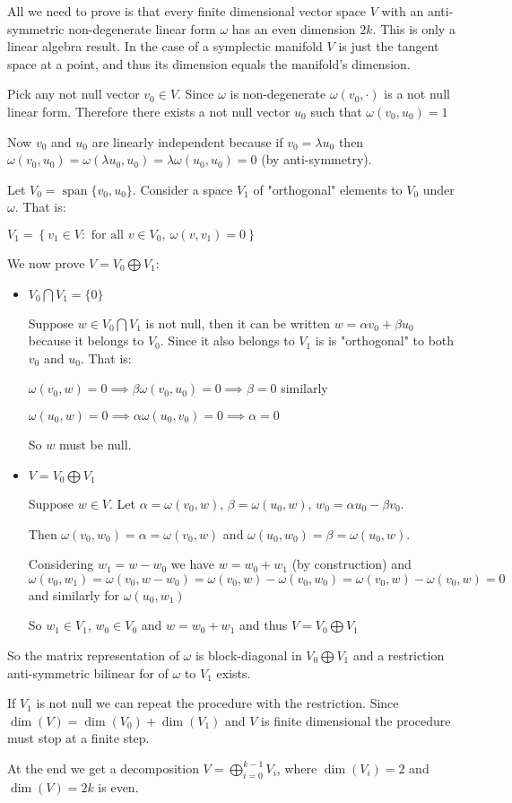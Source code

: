 \documentclass[12pt]{article}
\DeclareMathOperator{\dimens}{dim}
\DeclareMathOperator{\linspan}{span}
\begin{document}
All we need to prove is that every finite dimensional vector space $V$ with an anti-symmetric non-degenerate linear form $\omega$ has an even dimension $2k$. This is only a linear algebra result. In the case of a symplectic manifold $V$ is just the tangent space at a point, and thus its dimension equals the manifold's dimension.

Pick any not null vector $v_0 \in V$. Since $\omega$ is non-degenerate $\omega(v_0,\cdot)$ is a not null linear form. Therefore there exists a not null vector $u_0$ such that $\omega(v_0,u_0)=1$

Now $v_0$ and $u_0$ are linearly independent because if $v_0=\lambda u_0$ then $\omega(v_0, u_0) = \omega(\lambda u_0, u_0) = \lambda \omega(u_0,u_0) = 0$ (by anti-symmetry).

Let $V_0 = \linspan\{v_0, u_0\}$. Consider a space $V_1$ of "orthogonal" elements to $V_0$ under $\omega$. That is:

$V_1 = \left\{ v_1\in V: \text{ for all $v \in V_0$},\: \omega(v,v_1)=0 \right\}$

We now prove $V = V_0 \bigoplus V_1$:

\begin{itemize}

\item $V_0 \bigcap V_1 = \{0\}$

Suppose $w \in V_0 \bigcap V_1$ is not null, then it can be written $w = \alpha v_0 + \beta u_0$ because it belongs to $V_0$. Since it also belongs to $V_1$ is is "orthogonal" to both $v_0$ and $u_0$. That is:

$\omega(v_0,w) = 0 \implies \beta \omega(v_0,u_0) = 0 \implies \beta =0$
similarly

$\omega(u_0,w) = 0 \implies \alpha \omega(u_0,v_0) = 0 \implies \alpha =0$

So $w$ must be null.

\item $V = V_0 \bigoplus V_1$

Suppose $w \in V$. Let $\alpha = \omega(v_0,w)$, $\beta = \omega(u_0,w)$, $w_0 = \alpha u_0 - \beta v_0$.

Then $\omega(v_0,w_0) = \alpha = \omega(v_0,w)$ and $\omega(u_0,w_0)=\beta=\omega(u_0,w)$.

Considering $w_1=w - w_0$ we have $w = w_0 + w_1$ (by construction) and $\omega(v_0,w_1) = \omega(v_0, w-w_0)=\omega(v_0,w) - \omega(v_0,w_0) = \omega(v_0,w) -  \omega(v_0,w) =0 $ and similarly for $\omega(u_0,w_1)$

So $w_1 \in V_1$, $w_0 \in V_0$ and $w=w_0 + w_1$ and thus $V = V_0 \bigoplus V_1$

\end{itemize}

So the matrix representation of $\omega$ is block-diagonal in $V_0 \bigoplus V_1$ and a restriction anti-symmetric bilinear for of $\omega$ to $V_1$ exists.

If $V_1$ is not null we can repeat the procedure with the restriction. Since $\dimens(V)=\dimens(V_0)+\dimens(V_1)$ and $V$ is finite dimensional the procedure must stop at a finite step.

At the end we get a decomposition $V=\bigoplus_{i=0}^{k-1}V_i$, where $\dimens(V_i)=2$ and $\dimens(V)=2k$ is even.
\end{document}

